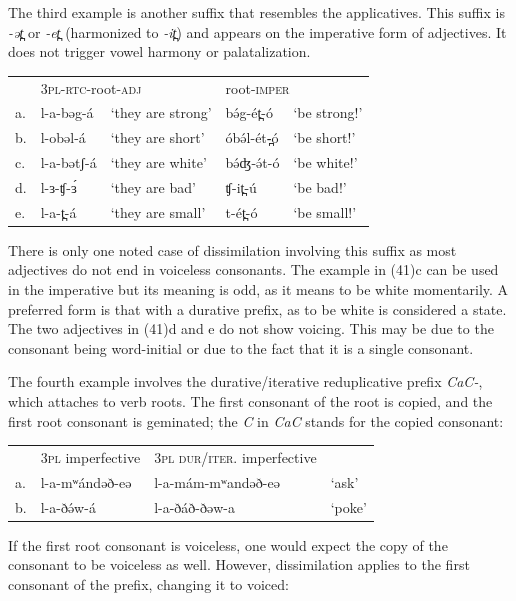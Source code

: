 The third example is another suffix that resembles the applicatives. This suffix is \textit{-ət̪} or \textit{-et̪} (harmonized to \textit{-it̪}) and appears on the imperative form of adjectives. It does not trigger vowel harmony or palatalization. 

\ea
\begin{tabular}[t]{lllll}
&	\multicolumn{2}{l}{3\textsc{pl}-\textsc{rtc}-root-\textsc{adj}}	&	\multicolumn{2}{l}{root-\textsc{imper}}\\
a.&	l-a-bəg-á	& `they are strong' &	bə́g-ét̪-ó	&	‘be strong!’\\
b.&	l-obəl-á	& `they are short' &	óbə́l-ét-̪ó	&	‘be short!’\\
c.& l-a-bətʃ-á	& `they are white' &	bə́ʤ-ə́t-ó	&	‘be white!’   \\
d.& l-ɜ-ʧ-ɜ́	& `they are bad'	&	ʧ-it̪-ú		&	‘be bad!’\\
e.& l-a-t̪-á	& `they are small'	&	t-ét̪-ó		&	‘be small!’\\
\end{tabular}
\z

There is only one noted case of dissimilation involving this suffix as most adjectives do not end in voiceless consonants. The example in (41)c can be used in the imperative but its meaning is odd, as it means to be white momentarily. A preferred form is that with a durative prefix, as to be white is considered a state. The two adjectives in (41)d and e do not show voicing. This may be due to the consonant being word-initial or due to the fact that it is a single consonant. 

The fourth example involves the durative/iterative reduplicative prefix \textit{CaC-}, which attaches to verb roots. The first consonant of the root is copied, and the first root consonant is geminated; the \textit{C} in \textit{CaC} stands for the copied consonant:

\ea
\begin{tabular}[t]{llll}
&	 	3\textsc{pl} imperfective		&	3\textsc{pl} \textsc{dur}/\textsc{iter}. imperfective\\
	a.&		l-a-mʷándəð-eə 	&	l-a-mám-mʷandəð-eə	&	‘ask’\\
	b.&		l-a-ðə́w-á		&	l-a-ðáð-ðəw-a		&	‘poke’\\
\end{tabular}
\z

If the first root consonant is voiceless, one would expect the copy of the consonant to be voiceless as well. However, dissimilation applies to the first consonant of the prefix, changing it to voiced:

